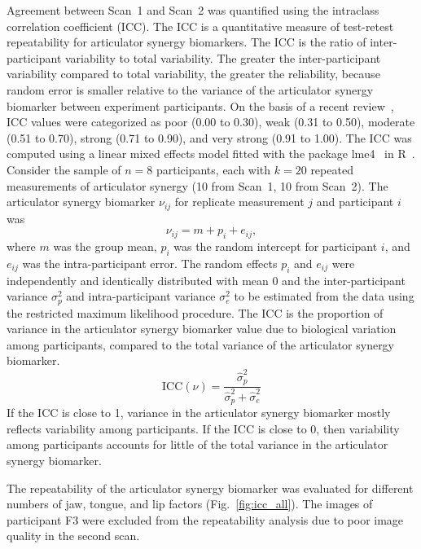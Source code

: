 \documentclass[preprint]{JASAnew}
\begin{document}
Agreement between Scan~1 and Scan~2 was quantified using the intraclass correlation coefficient (ICC). The ICC is a quantitative measure of test-retest repeatability for articulator synergy biomarkers. 
The ICC is the ratio of inter-participant variability to total variability. The greater the inter-participant variability compared to total variability, the greater the reliability, because random error is smaller relative to the variance of the articulator synergy biomarker between experiment participants. 
On the basis of a recent review~\citep{lebreton2007answers}, ICC values were categorized as poor (\num{0.00} to \num{0.30}), weak (\num{0.31} to \num{0.50}), moderate (\num{0.51} to \num{0.70}), strong (\num{0.71} to \num{0.90}), and very strong (\num{0.91} to \num{1.00}).
%
The ICC was computed using a linear mixed effects model fitted with the package lme4~\citep{bates2015fitting} in R~\citep{r2017language}. Consider the sample of $n=8$ participants, each with $k=20$ repeated measurements of articulator synergy (\num{10} from Scan~1, \num{10} from Scan~2). The articulator synergy biomarker $\nu _{ij}$ for replicate measurement $j$ and participant $i$ was 
%
\begin{equation}
\nu _{ij} = m + p_i + e_{ij},
\end{equation}
%
where $m$ was the group mean, $p_i$ was the random intercept for participant $i$, and $e_{ij}$ was the intra-participant error. 
%
The random effects $p_i$ and $e_{ij}$ were independently and identically distributed with mean 0 and the inter-participant variance $\sigma_p^2$ and intra-participant variance $\sigma_e^2$ to be estimated from the data using the restricted maximum likelihood procedure. 
% 
The ICC is the proportion of variance in the articulator synergy biomarker value due to biological variation among participants, compared to the total variance of the articulator synergy biomarker.
%
\begin{equation}
\text{ICC}(\nu) = \frac{\hat{\sigma}_p^2}{\hat{\sigma}_p^2 + \hat{\sigma}_e^2}
\end{equation}
%
If the ICC is close to \num{1}, variance in the articulator synergy biomarker mostly reflects variability among participants. 
%
If the ICC is close to \num{0}, then variability among participants accounts for little of the total variance in the articulator synergy biomarker. 

The repeatability of the articulator synergy biomarker was evaluated for different numbers of jaw, tongue, and lip factors (Fig.~\ref{fig:icc_all}). 
%
The images of participant F3 were excluded from the repeatability analysis due to poor image quality in the second scan. 
\end{document}
